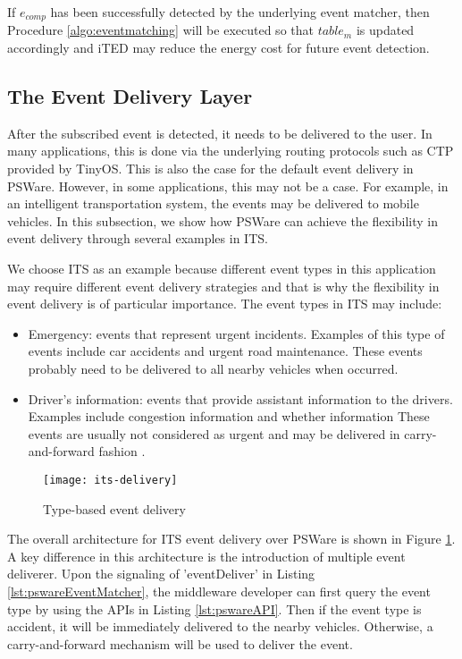 If \(e_{comp}\) has been successfully detected by the underlying event matcher, then Procedure \ref{algo:eventmatching} will be executed so that \(table_m\) is updated accordingly and iTED may reduce the energy cost for future event detection.

\subsection{The Event Delivery Layer}
After the subscribed event is detected, it needs to be delivered to the user. In many applications, this is done via the underlying routing protocols such as CTP provided by TinyOS. This is also the case for the default event delivery in PSWare. However, in some applications, this may not be a case. For example, in an intelligent transportation system, the events may be delivered to mobile vehicles. In this subsection, we show how PSWare can achieve the flexibility in event delivery through several examples in ITS.

We choose ITS as an example because different event types in this application may require different event delivery strategies and that is why the flexibility in event delivery is of particular importance. The event types in ITS may include:
\begin{itemize}
\item Emergency: events that represent urgent incidents. Examples of this type of events include car accidents and urgent road maintenance. These events probably need to be delivered to all nearby vehicles when occurred.
\item Driver's information: events that provide assistant information to the drivers. Examples include congestion information and whether information These events are usually not considered as urgent and may be delivered in carry-and-forward fashion \cite{cartel}.
\end{itemize}

\begin{figure}
\centering
\texttt{[image: its-delivery]}
\caption{Type-based event delivery}
\label{fig:its-delivery}
\end{figure}

The overall architecture for ITS event delivery over PSWare is shown in Figure \ref{fig:its-delivery}. A key difference in this architecture is the introduction of multiple event deliverer. Upon the signaling of 'eventDeliver' in Listing \ref{lst:pswareEventMatcher}, the middleware developer can first query the event type by using the APIs in Listing \ref{lst:pswareAPI}. Then if the event type is accident, it will be immediately delivered to the nearby vehicles. Otherwise, a carry-and-forward mechanism will be used to deliver the event.
